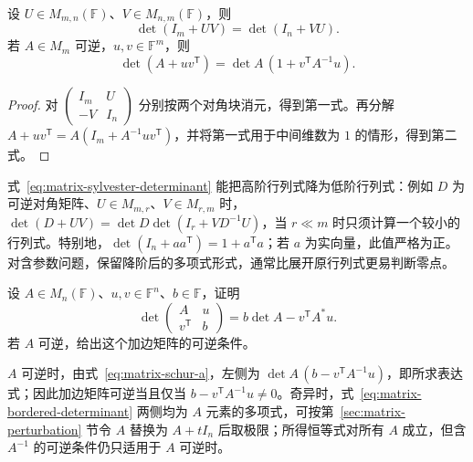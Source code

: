 \begin{corollary}
\label{cor:matrix-sylvester-determinant}
设 $U\in M_{m,n}(\mathbb F)$、$V\in M_{n,m}(\mathbb F)$，则
\begin{equation}
 \det(I_m+UV)=\det(I_n+VU).
 \label{eq:matrix-sylvester-determinant}
\end{equation}
若 $A\in M_m$ 可逆，$u,v\in\mathbb F^m$，则
\begin{equation}
 \det(A+uv^{\mathsf T})=\det A\,(1+v^{\mathsf T}A^{-1}u).
 \label{eq:matrix-determinant-lemma}
\end{equation}
\end{corollary}
\begin{proof}
对 $\begin{pmatrix}I_m&U\\-V&I_n\end{pmatrix}$ 分别按两个对角块消元，得到第一式。再分解 $A+uv^{\mathsf T}=A(I_m+A^{-1}uv^{\mathsf T})$，并将第一式用于中间维数为 $1$ 的情形，得到第二式。
\end{proof}

式~\eqref{eq:matrix-sylvester-determinant} 能把高阶行列式降为低阶行列式：例如 $D$ 为可逆对角矩阵、$U\in M_{m,r}$、$V\in M_{r,m}$ 时，$\det(D+UV)=\det D\det(I_r+VD^{-1}U)$，当 $r\ll m$ 时只须计算一个较小的行列式。特别地，$\det(I_n+aa^{\mathsf T})=1+a^{\mathsf T}a$；若 $a$ 为实向量，此值严格为正。对含参数问题，保留降阶后的多项式形式，通常比展开原行列式更易判断零点。

\begin{example}
\label{ex:matrix-bordered-determinant}
设 $A\in M_n(\mathbb F)$、$u,v\in\mathbb F^n$、$b\in\mathbb F$，证明
\begin{equation}
 \det\begin{pmatrix}A&u\\v^{\mathsf T}&b\end{pmatrix}
 =b\det A-v^{\mathsf T}A^*u.
 \label{eq:matrix-bordered-determinant}
\end{equation}
若 $A$ 可逆，给出这个加边矩阵的可逆条件。
\end{example}
\begin{solve}
$A$ 可逆时，由式~\eqref{eq:matrix-schur-a}，左侧为 $\det A\,(b-v^{\mathsf T}A^{-1}u)$，即所求表达式；因此加边矩阵可逆当且仅当 $b-v^{\mathsf T}A^{-1}u\ne0$。奇异时，式~\eqref{eq:matrix-bordered-determinant} 两侧均为 $A$ 元素的多项式，可按第~\ref{sec:matrix-perturbation} 节令 $A$ 替换为 $A+tI_n$ 后取极限；所得恒等式对所有 $A$ 成立，但含 $A^{-1}$ 的可逆条件仍只适用于 $A$ 可逆时。
\end{solve}

